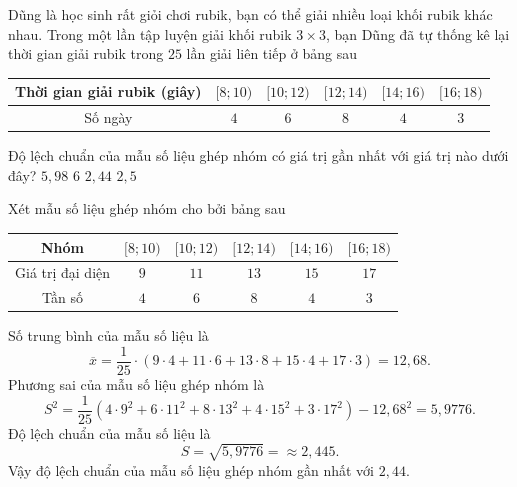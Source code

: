 \begin{ex}
	Dũng là học sinh rất giỏi chơi rubik, bạn có thể giải nhiều loại khối rubik khác nhau. Trong một lần tập luyện giải khối rubik $3\times 3$, bạn Dũng đã tự thống kê lại thời gian giải	rubik trong $25$ lần giải liên tiếp ở bảng sau
	\begin{center}
		\begin{tabular}{|c|c|c|c|c|c|}
			\hline
			Thời gian giải rubik (giây)&$[8;10)$  & $[10;12)$ & $[12;14)$ & $[14;16)$ & $[16;18)$ \\
			\hline
			Số ngày	& $4$ & $6$ & $8$ & $4$ & $3$ \\
			\hline
		\end{tabular}
	\end{center}
	Độ lệch chuẩn của mẫu số liệu ghép nhóm có giá trị gần nhất với giá trị nào dưới đây?
	\choice 
	{$5{,}98$}
	{$6$}
	{\True $2{,}44$}
	{$2{,}5$}
	\loigiai 
	{
		Xét mẫu số liệu ghép nhóm cho bởi bảng sau
		\begin{center}
			\begin{tabular}{|c|c|c|c|c|c|}
				\hline
				Nhóm &$[8;10)$  & $[10;12)$ & $[12;14)$ & $[14;16)$ & $[16;18)$ \\
				\hline
				Giá trị đại diện & $9$ & $11$ & $13$ & $15$ & $17$ \\
				\hline
				Tần số	& $4$ & $6$ & $8$ & $4$ & $3$ \\
				\hline
			\end{tabular}
		\end{center}
		Số trung bình của mẫu số liệu là 
		$$\overline{x}=\dfrac{1}{25}\cdot (9\cdot 4+11\cdot 6+13\cdot 8+15\cdot 4+17\cdot 3)=12{,}68.$$
		Phương sai của mẫu số liệu ghép nhóm là 
		$$S^2=\dfrac{1}{25}\left(4\cdot 9^2+6\cdot 11^2+8\cdot 13^2+4\cdot 15^2+3\cdot 17^2\right)-12{,}68^2=5{,}9776.$$
		Độ lệch chuẩn của mẫu số liệu là 
		$$S=\sqrt{5{,}9776}=\approx 2{,}445.$$
		Vậy độ lệch chuẩn của mẫu số liệu ghép nhóm gần nhất với $2{,}44$.
	}
\end{ex}
